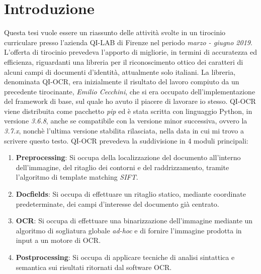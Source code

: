 \chapter*{Introduzione}

Questa tesi vuole essere un riassunto delle attivit\`a svolte in un tirocinio curriculare presso l'azienda QI-LAB di Firenze nel periodo \textit{marzo - giugno 2019}. L'offerta di tirocinio prevedeva l'apporto di migliorie, in termini di accuratezza ed efficienza, riguardanti una libreria per il riconoscimento ottico dei caratteri di alcuni campi di documenti d'identit\`a, attualmente solo italiani. La libreria, denominata QI-OCR, era inizialmente il risultato del lavoro compiuto da un precedente tirocinante, \textit{Emilio Cecchini}, che si era occupato dell'implementazione del framework di base, sul quale ho avuto il piacere di lavorare io stesso. QI-OCR viene distribuita come pacchetto \textit{pip} ed \`e stata scritta con linguaggio Python, in versione \textit{3.6.8}, anche se compatibile con la versione minor successiva, ovvero la \textit{3.7.x}, nonch\`e l'ultima versione stabilita rilasciata, nella data in cui mi trovo a scrivere questo testo. QI-OCR prevedeva la suddivisione in 4 moduli principali:
\begin{enumerate}
	\item \textbf{Preprocessing}: Si occupa della localizzazione del documento all'interno dell'immagine, del ritaglio dei contorni e del raddrizzamento, tramite l'algoritmo di template matching \textit{SIFT}.
	\item \textbf{Docfields}: Si occupa di effettuare un ritaglio statico, mediante coordinate predeterminate, dei campi d'interesse del documento gi\`a centrato.
	\item \textbf{OCR}: Si occupa di effettuare una binarizzazione dell'immagine mediante un algoritmo di sogliatura globale \textit{ad-hoc} e di fornire l'immagine prodotta in input a un motore di OCR.
	\item \textbf{Postprocessing}: Si occupa di applicare tecniche di analisi sintattica e semantica sui risultati ritornati dal software OCR.
\end{enumerate}
